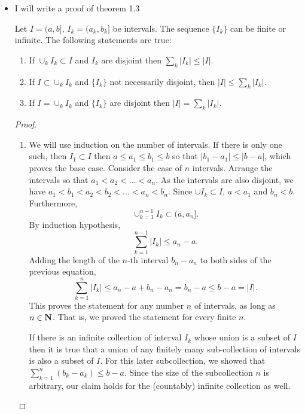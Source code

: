 \begin{itemize}
\item I will write a proof of theorem 1.3
\begin{thm}
Let $I = (a, b]$, $I_k = (a_k, b_k]$ be intervals. The sequence $\{I_k\}$
can be finite or infinite. The following statements are true:
\begin{enumerate}
\item If $\cup_k I_k \subset I$ and $I_k$ are disjoint then $\sum_k|I_k| \le 
|I|$.
\item If $I \subset \cup_k I_k$ and $\{I_k\}$ not necessarily disjoint, then
$|I| \le \sum_k |I_k|$.
\item If $I = \cup_k I_k$ and $\{I_k\}$ are disjoint then $|I| = \sum_k|I_k|$.
\end{enumerate}
\end{thm}
\begin{proof}
\begin{enumerate}
\item We will use induction on the number of intervals. If there is only one
such, then $I_1 \subset I$ then $a \le a_1 \le b_1 \le b$ so that $|b_1 - a_1| 
\le |b - a|$, which proves the base case. Consider the case of $n$ intervals.
Arrange the intervals so that $a_1 < a_2 < \ldots < a_n$. As the intervals are 
also disjoint, we have $a_1 < b_1 < a_2 < b_2 < \ldots < a_n < b_n$. Since 
$\cup I_k \subset I$, $a < a_1$ and $b_n < b$. Furthermore,
\[
\cup_{k=1}^{n-1}I_k \subset (a, a_n].
\]
By induction hypothesis, 
\[
\sum_{k=1}^{n-1} |I_k| \le a_n - a.
\]
Adding the length of the $n$-th interval $b_n - a_n$ to both sides of the
previous equation,
\[
\sum_{k=1}^n |I_k| \le a_n - a + b_n - a_n = b_n - a \le b - a = |I|.
\]
This proves the statement for any number $n$ of intervals, as long as $n \in
\mathbf{N}$. That is, we proved the statement for every finite $n$.

If there is an infinite collection of interval $I_k$ whose union is a subset
of $I$ then it is true that a union of any finitely many sub-collection of
intervals is also a subset of $I$. For this later subcollection, we showed
that $\sum_{k=1}^n (b_k - a_k) \le b - a$. Since the size of the subcollection
$n$ is arbitrary, our claim holds for the (countably) infinite collection as 
well.


\end{enumerate}
\end{proof}
\end{itemize}
